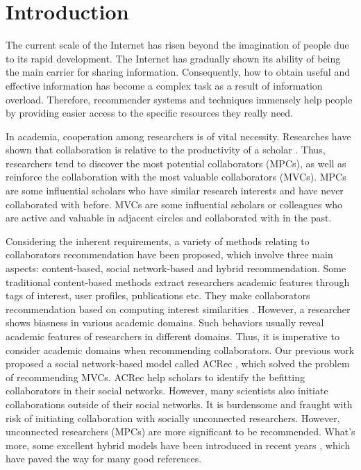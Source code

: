 \documentclass[review]{elsarticle}
\begin{document}
\linenumbers


\section{Introduction}
The current scale of the Internet has risen beyond the imagination of people due to its rapid development. The Internet has gradually shown its ability of being the main carrier for sharing information. Consequently, how to obtain useful and effective information has become a complex task as a result of information overload. Therefore, recommender systems and techniques immensely help people by providing easier access to the specific resources they really need.

In academia, cooperation among researchers is of vital necessity. Researches have shown that collaboration is relative to the productivity of a scholar \cite{lee2005impact}. Thus, researchers tend to discover the most potential collaborators (MPCs), as well as reinforce the collaboration with the most valuable collaborators (MVCs). MPCs are some influential scholars who have similar research interests and have never collaborated with before. MVCs are some influential scholars or colleagues who are active and valuable in adjacent circles and collaborated with in the past.

Considering the inherent requirements, a variety of methods relating to collaborators recommendation have been proposed, which involve three main aspects: content-based, social network-based and hybrid recommendation. Some traditional content-based methods extract researchers academic features through tags of interest, user profiles, publications etc. They make collaborators recommendation based on computing interest similarities \cite{lopes2010collaboration,gollapalli2012similar,kim2010collaborative}. However, a researcher shows biasness in various academic domains. Such behaviors usually reveal academic features of researchers in different domains. Thus, it is imperative to consider academic domains when recommending collaborators. Our previous work proposed a social network-based model called ACRec \cite{li2014acrec}, which solved the problem of recommending MVCs. ACRec help scholars to identify the befitting collaborators in their social networks. However, many scientists also initiate collaborations outside of their social networks. It is burdensome and fraught with risk of initiating collaboration with socially unconnected researchers. However, unconnected researchers (MPCs) are more significant to be recommended. What's more, some excellent hybrid models have been introduced in recent years \cite{lee2011recommending,chen2011collabseer,cohen2013recommending}, which have paved the way for many good references.
\end{document}
